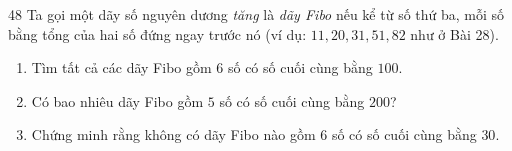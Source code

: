 \begin{probbox}{48}{}
Ta gọi một dãy số nguyên dương \emph{tăng} là \emph{dãy Fibo} nếu kể từ số thứ ba, mỗi số bằng tổng của hai số đứng ngay trước nó (ví dụ: $11, 20, 31, 51, 82$ như ở Bài 28).
\begin{enumerate}[label=\alph*),leftmargin=1.6em,itemsep=1pt]
\item Tìm tất cả các dãy Fibo gồm $6$ số có số cuối cùng bằng $100$.
\item Có bao nhiêu dãy Fibo gồm $5$ số có số cuối cùng bằng $200$?
\item Chứng minh rằng không có dãy Fibo nào gồm $6$ số có số cuối cùng bằng $30$.
\end{enumerate}
\end{probbox}
